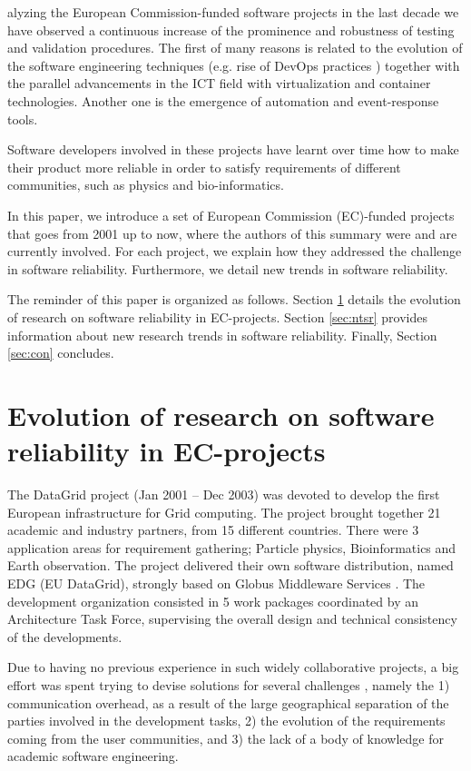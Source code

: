\documentclass[journal]{IEEEtran}
\begin{document}
alyzing the European Commission-funded software projects in the last decade we have observed a continuous
increase of the prominence and robustness of testing and validation procedures. The first of many reasons is related to the evolution of the software engineering
techniques (e.g. rise of DevOps practices \cite{zhu}) together with the parallel advancements in the ICT field with virtualization and container
technologies. Another one is the emergence of automation and event-response tools. 

Software developers involved in these projects have learnt over time how to make their product more reliable in order to satisfy requirements of different communities, such as physics and bio-informatics.

In this paper, we introduce a set of European Commission (EC)-funded projects that goes from
2001 up to now, where the authors of this summary were and are currently
involved. For each project, we explain how they addressed the challenge in
software reliability. Furthermore, we detail new trends in software reliability.

The reminder of this paper is organized as follows. Section \ref{sec:ev} details the evolution of research on software reliability in EC-projects. Section \ref{sec:ntsr} provides information about new research trends in software reliability. Finally, Section \ref{sec:con} concludes. 

\section{Evolution of research on software reliability in EC-projects}
\label{sec:ev}

The DataGrid \cite{cordis:datagrid} project (Jan 2001 -- Dec 2003) was devoted
to develop the first European infrastructure for Grid computing. The project
brought together 21 academic and industry partners, from 15 different
countries. There were 3 application areas for requirement gathering;
Particle physics, Bioinformatics and Earth observation. The project delivered
their own software distribution, named EDG (EU DataGrid), strongly based on
Globus Middleware Services \cite{globus}. The development organization
consisted in 5 work packages coordinated by an Architecture Task Force,
supervising the overall design and technical consistency of the developments.

Due to having no previous experience in such widely
collaborative projects, a big effort was spent trying to devise solutions for several
challenges \cite{datagrid}, namely the 1) communication overhead, as a
result of the large geographical separation of the parties involved in the
development tasks, 2) the evolution of the requirements coming from the user
communities, and 3) the lack of a body of knowledge for academic software
engineering.
\end{document}
